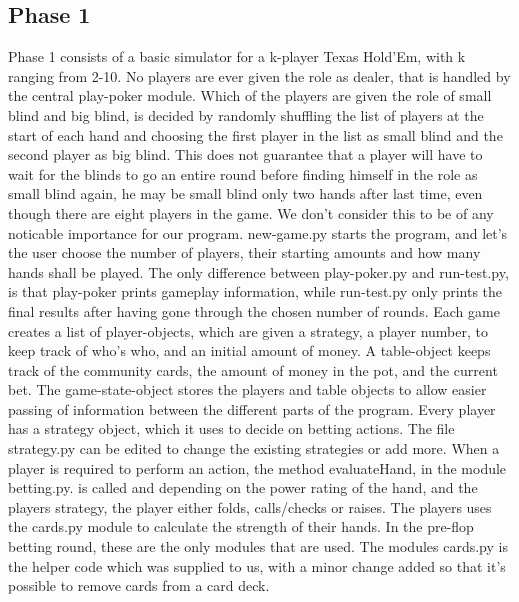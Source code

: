 \documentclass[titlepage]{article}
\begin{document}
	\subsection{Phase 1}
	    Phase 1 consists of a basic simulator for a k-player Texas Hold'Em, with k ranging from 2-10. No players are ever given the role as dealer, that is handled by the central play-poker module. Which of the players are given the role of small blind and big blind, is decided by randomly shuffling the list of players at the start of each hand and choosing the first player in the list as small blind and the second player as big blind. This does not guarantee that a player will have to wait for the blinds to go an entire round before finding himself in the role as small blind again, he may be small blind only two hands after last time, even though there are eight players in the game. We don't consider this to be of any noticable importance for our program. 
new-game.py starts the program, and let's the user choose the number of players, their starting amounts and how many hands shall be played. The only difference between play-poker.py and run-test.py, is that play-poker prints gameplay information, while run-test.py only prints the final results after having gone through the chosen number of rounds. Each game creates a list of player-objects, which are given a strategy, a player number, to keep track of who's who, and an initial amount of money. A table-object keeps track of the community cards, the amount of money in the pot, and the current bet. The game-state-object stores the players and table objects to allow easier passing of information between the different parts of the program. Every player has a strategy object, which it uses to decide on betting actions. The file strategy.py can be edited to change the existing strategies or add more. When a player is required to perform an action, the method evaluateHand, in the module betting.py. is called and depending on the power rating of the hand, and the players strategy, the player either folds, calls/checks or raises. The players uses the cards.py module to calculate the strength of their hands. In the pre-flop betting round, these are the only modules that are used. The modules cards.py is the helper code which was supplied to us, with a minor change added so that it's possible to remove cards from a card deck.
		
\end{document}
